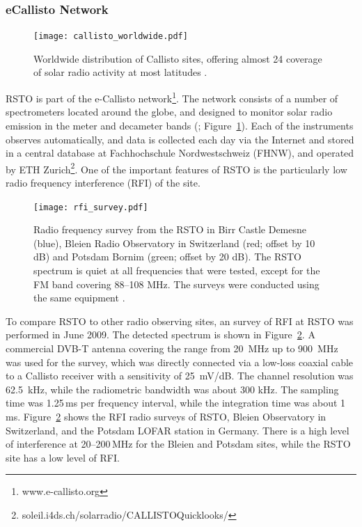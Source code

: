 \subsubsection{eCallisto Network}
\begin{figure}[!t]
\begin{center}
\texttt{[image: callisto\_worldwide.pdf]}
\caption[Callisto Worldwide]{Worldwide distribution of Callisto sites, offering almost 24 coverage of solar radio activity at most latitudes \citep{zucca2012}.}
\label{fig:callisto_worldwide}
\end{center}
\end{figure}
RSTO is part of the e-Callisto network\footnote{www.e-callisto.org}. The network consists of a number of spectrometers located around the globe, and designed to monitor solar radio emission in the meter and decameter bands (\citealt{Benz2009}; Figure~\ref{fig:callisto_worldwide}).  Each of the instruments observes automatically, and data is collected each day via the Internet and stored in a central database at Fachhochschule Nordwestschweiz (FHNW), and operated by ETH Zurich\footnote{soleil.i4ds.ch/solarradio/CALLISTOQuicklooks/}. One of the important features of RSTO is the particularly low radio frequency interference (RFI) of the site. 
\begin{figure}[!t]
\begin{center}
\texttt{[image: rfi\_survey.pdf]}
\caption[RSTO RFI Survey]{Radio frequency survey from the RSTO in Birr Castle Demesne (blue), Bleien Radio Observatory in Switzerland (red; offset by 10 dB) and Potsdam Bornim (green; offset by 20 dB). The RSTO spectrum is quiet at all frequencies that were tested, except for the FM band covering 88--108 MHz. The surveys were conducted using the same equipment \citep{zucca2012}.}
\label{fig:rfisurvey}
\end{center}
\end{figure}

To compare RSTO to other radio observing sites, an survey of RFI at RSTO was performed in June 2009. The detected spectrum is shown in Figure~\ref{fig:rfisurvey}.  A commercial DVB-T antenna covering the range from 20~MHz up to 900~MHz was used for the survey, which was directly connected via a low-loss coaxial cable to a Callisto receiver with a sensitivity of 25~mV/dB. The channel resolution was 62.5~kHz, while the radiometric bandwidth was about 300 kHz. The sampling time was 1.25\,ms per frequency interval, while the integration time was about 1\,ms.  Figure~\ref{fig:rfisurvey} shows the RFI radio surveys of RSTO, Bleien Observatory in Switzerland, and the Potsdam LOFAR station in Germany. There is a high level of interference at 20--200\,MHz for the Bleien and Potsdam sites, while the RSTO site has a low level of RFI.

